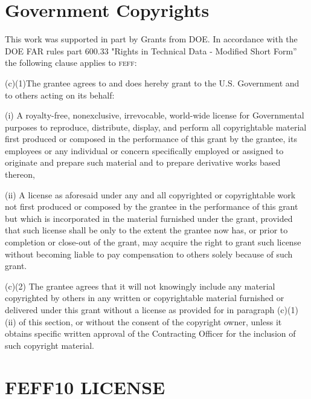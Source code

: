 \documentclass[11pt,oneside]{report} %
\newcommand{\program}[1]{\textsc{#1}}
\newcommand{\feff}{\program{feff}}
\begin{document}
\begin{latexonly}
\section{Government Copyrights}
\label{sec:Governm-Copyr}

This work was supported in part by Grants from DOE. In accordance with
the DOE FAR rules part 600.33 "Rights in Technical Data - Modified
Short Form'' the following clause applies to {\feff}:

(c)(1)The grantee agrees to and does hereby grant to the U.S.
Government and to others acting on its behalf:

(i) A royalty-free, nonexclusive, irrevocable, world-wide license for
Governmental purposes to reproduce, distribute, display, and perform
all copyrightable material first produced or composed in the
performance of this grant by the grantee, its employees or any
individual or concern specifically employed or assigned to originate
and prepare such material and to prepare derivative works based
thereon,

(ii) A license as aforesaid under any and all copyrighted or
copyrightable work not first produced or composed by the grantee in the
performance of this grant but which is incorporated in the material
furnished under the grant, provided that such license shall be only to
the extent the grantee now has, or prior to completion or close-out of
the grant, may acquire the right to grant such license without becoming
liable to pay compensation to others solely because of such grant.

(c)(2) The grantee agrees that it will not knowingly include any
material copyrighted by others in any written or copyrightable material
furnished or delivered under this grant without a license as provided
for in paragraph (c)(1)(ii) of this section, or without the consent of
the copyright owner, unless it obtains specific written approval of the
Contracting Officer for the inclusion of such copyright material.

\section{FEFF10 LICENSE}
\label{sec:F10license}


\end{latexonly}
\end{document}
